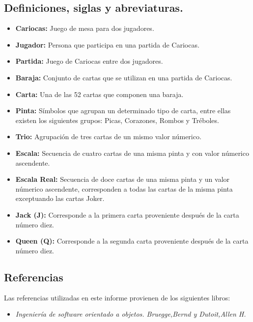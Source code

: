 \subsection{Definiciones, siglas y abreviaturas.}\label{cap:definiciones}
\begin{itemize}
    \item \textbf{Cariocas:} Juego de mesa para dos jugadores.
    \item \textbf{Jugador:} Persona que participa en una partida de Cariocas.
    \item \textbf{Partida:} Juego de Cariocas entre dos jugadores.
    \item \textbf{Baraja:} Conjunto de cartas que se utilizan en una partida de Cariocas.
    \item \textbf{Carta:} Una de las 52 cartas que componen una baraja.
    \item \textbf{Pinta:} Símbolos que agrupan un determinado tipo de carta, entre ellas existen los siguientes grupos: Picas, Corazones, Rombos y Tréboles.
    \item \textbf{Trio:} Agrupación de tres cartas de un mismo valor númerico.
    \item \textbf{Escala:} Secuencia de cuatro cartas de una misma pinta y con valor númerico ascendente.
    \item \textbf{Escala Real:} Secuencia de doce cartas de una misma pinta y un valor númerico ascendente, corresponden a todas las cartas de la misma pinta exceptuando las cartas Joker.
    \item \textbf{Jack (J):} Corresponde a la primera carta proveniente después de la carta número diez.
    \item \textbf{Queen (Q):} Corresponde a la segunda carta proveniente después de la carta número diez.
\end{itemize}
\subsection{Referencias}
Las referencias utilizadas en este informe provienen de los siguientes libros:
\begin{itemize}
    \item \textit{Ingeniería de software orientado a objetos. Bruegge,Bernd y Dutoit,Allen H.} \cite{oop}
\end{itemize}